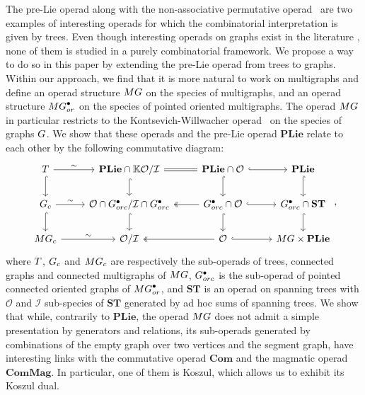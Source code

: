 \documentclass[11pt]{article}
\theoremstyle{definition}
\numberwithin{equation}{section}
\newcommand{\spe}[1]{\normalfont{\textsc{#1}}}
\newcommand{\op}[1]{\mathbf{#1}}
\newcommand{\K}{\mathbb{K}}
\newcommand{\point}[1]{#1^{\bullet}}
\newcommand{\T}{\spe{T}}
\newcommand{\G}{\spe{G}}
\newcommand{\MG}{\spe{MG}}
\newcommand{\Operad}{\mathcal{O}}
\newcommand{\PLie}{\op{PLie}}
\newcommand{\Com}{\op{Com}}
\newcommand{\ComMag}{\op{ComMag}}
\newcommand{\ST}{\op{ST}}
\begin{document}
The pre-Lie operad along with the non-associative permutative operad~\cite{Liv06} are two examples
of interesting operads for which the combinatorial interpretation is given by trees. Even though 
interesting operads on graphs exist in the literature \cite{Kreimer:2000ja,Kon99,Wil05,MV19}, none 
of them is studied in a purely combinatorial framework. We propose a way to do so in this paper by 
extending the pre-Lie operad from trees to graphs.
Within our approach, we find that it is more natural to work on multigraphs and define an operad 
structure $\MG$ on the species of multigraphs, and an operad structure $\point{\MG}_{or}$ on the 
species of pointed oriented multigraphs. The operad $\MG$ in particular restricts to the 
Kontsevich-Willwacher operad~\cite{MV19} on the species of graphs $\G$. We show that these operads 
and the pre-Lie operad $\PLie$ relate to each other by the following commutative diagram:
\begin{equation*}
    \begin{tikzcd}
        \T \arrow[r, "\sim"] \arrow[d, hook]
        & \PLie\cap\K\Operad/\mathcal{I} \arrow[r, equal] \arrow[d, hook]
        & \PLie\cap\Operad \arrow[d,hook] \arrow[r, hook]
        & \PLie \arrow[d,hook]\\
        \G_c \arrow[r, "\sim"] \arrow[d, hook]
        & \Operad\cap\point{\G}_{orc}/\mathcal{I}\cap\point{\G_{orc}} \arrow[d, hook]
        & \point{\G}_{orc}\cap\Operad \arrow[l, two heads] \arrow[r, hook] \arrow[d, hook]
        & \point{\G}_{orc}\cap\ST \arrow[d, hook] \\
        \MG_c \arrow[r, "\sim"]
        & \Operad/\mathcal{I}
        & \Operad \arrow[l, two heads] \arrow[r, hook]
        & \MG\times\PLie
    \end{tikzcd},
\end{equation*}
where $\T$, $\G_c$ and $\MG_c$ are respectively the sub-operads of trees, connected graphs and 
connected multigraphs of $\MG$, $\point{\G_{orc}}$ is the sub-operad of pointed connected oriented 
graphs of $\point{\MG}_{or}$, and $\ST$ is an operad on spanning trees with $\Operad$ and 
$\mathcal{I}$ sub-species of $\ST$ generated by ad hoc sums of spanning trees. 
We show that while, contrarily to $\PLie$, the operad $\MG$ does not admit a simple presentation by 
generators and relations, its sub-operads generated by combinations of the empty graph over two vertices 
and the segment graph, have interesting links with the commutative operad $\Com$ and the magmatic 
operad $\ComMag$. In particular, one of them is Koszul, which allows us to exhibit its Koszul dual.
\end{document}
